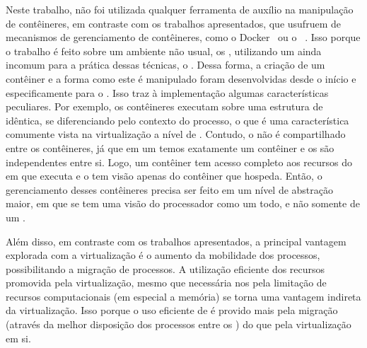 Neste trabalho, não foi utilizada qualquer ferramenta de auxílio na manipulação de contêineres, em contraste com os trabalhos apresentados, que usufruem de mecanismos de gerenciamento de contêineres, como o Docker~\cite{smartcarslwvirtualization,karhula2019checkpointing} ou o \lxc~\cite{abeni2019container}. Isso porque o trabalho é feito sobre um ambiente não usual, os \lws, utilizando um \so ainda incomum para a prática dessas técnicas, o \nanvix. Dessa forma, a criação de um contêiner e a forma como este é manipulado foram desenvolvidas desde o início e especificamente para o \nanvix. Isso traz à implementação algumas características peculiares. Por exemplo, os contêineres executam sobre uma estrutura de  idêntica, se diferenciando pelo contexto do processo, o que é uma característica comumente vista na virtualização a nível de \so. Contudo, o  não é compartilhado entre os contêineres, já que em um \cluster temos exatamente um contêiner e os \clusters são independentes entre si. Logo, um contêiner tem acesso completo aos recursos do \cluster em que executa e o \cluster tem visão apenas do contêiner que hospeda. Então, o gerenciamento desses contêineres precisa ser feito em um nível de abstração maior, em que se tem uma visão do processador como um todo, e não somente de um \cluster.

Além disso, em contraste com os trabalhos apresentados, a principal vantagem explorada com a virtualização é o aumento da mobilidade dos processos, possibilitando a migração de processos. A utilização eficiente dos recursos promovida pela virtualização, mesmo que necessária nos \lws pela limitação de recursos computacionais (em especial a memória) se torna uma vantagem indireta da virtualização. Isso porque o uso eficiente de \hardware é provido mais pela migração (através da melhor disposição dos processos entre os \clusters) do que pela virtualização em si.

